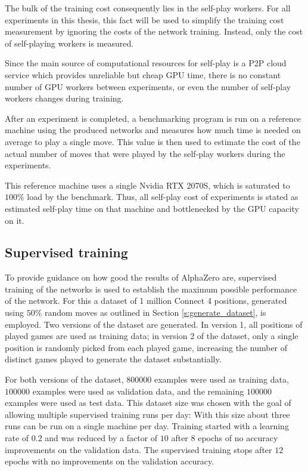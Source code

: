 \documentclass[12pt,onecolumn,oneside,titlepage]{article}
\begin{document}
The bulk of the training cost consequently lies in the self-play workers. 
For all experiments in this thesis, this fact will be used to simplify the training cost measurement by ignoring the costs of the network training. 
Instead, only the cost of self-playing workers is measured.

Since the main source of computational resources for self-play is a P2P cloud service which provides unreliable but cheap GPU time, there is no constant number of GPU workers between experiments,
or even the number of self-play workers changes during training.

After an experiment is completed, a benchmarking program is run on a reference machine using the produced networks and measures how much time is needed on average 
to play a single move. This value is then used to estimate the cost of the actual number of moves that were played by the self-play workers during the experiments.

This reference machine uses a single Nvidia RTX 2070S, which is saturated to $100\%$ load by the benchmark. Thus, all self-play cost of experiments is stated as estimated 
self-play time on that machine and bottlenecked by the GPU capacity on it.

\subsection{Supervised training}\label{sec:supervised}

To provide guidance on how good the results of AlphaZero are, supervised training of the networks is used to establish the maximum possible performance of the network.
For this a dataset of 1 million Connect 4 positions, generated using $50\%$ random moves as outlined in Section \ref{s:generate_dataset}, is employed.
Two versions of the dataset are generated. In version 1, all positions of played games are used as training data;
in version 2 of the dataset, only a single position is randomly picked from each played game, increasing the number of distinct games played to generate the dataset substantially.

For both versions of the dataset, $800000$ examples were used as training data, $100000$ examples were used as validation data, and the remaining 
$100000$ examples were used as test data. This dataset size was chosen with the goal of allowing multiple 
supervised training runs per day: With this size about three runs can be run on a single machine per day.
Training started with a learning rate of $0.2$ and was reduced by a factor of $10$ after $8$ epochs of no accuracy 
improvements on the validation data. The supervised training stops after $12$ epochs with no improvements on the validation accuracy.
\end{document}
